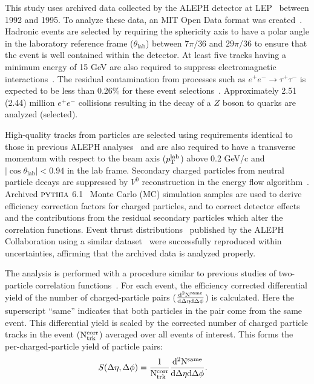 \documentclass[aps,prl,twocolumn,superscriptaddress,groupedaddress]{revtex4}  %
\begin{document}
This study uses archived data collected by the ALEPH detector at LEP~\cite{Decamp:1990jra} between 1992 and 1995. To analyze these data, an MIT Open Data format was created~\cite{Tripathee:2017ybi}. Hadronic events are selected by requiring the sphericity axis to have a polar angle in the laboratory reference frame ($\theta_{\text{lab}}$) between $7\pi/36$ and $29\pi/36$ to ensure that the event is well contained within the detector. At least five tracks having a minimum energy of 15 GeV are also required to suppress electromagnetic interactions~\cite{Barate:1996fi}. The residual contamination from processes such as $e^+e^-\rightarrow\tau^+\tau^-$ is expected to be less than 0.26\% for these event selections~\cite{Barate:1996fi}. Approximately 2.51 (2.44) million $e^+e^-$ collisions resulting in the decay of a $Z$ boson to quarks are analyzed (selected).

  High-quality tracks from particles are selected using requirements identical to those in previous ALEPH analyses~\cite{Barate:1996fi} and are also required to have a transverse momentum with respect to the beam axis ($p_{\rm T}^{\rm lab}$) above 0.2 GeV/c and $|\cos{\theta_{\text{lab}}}|<0.94$ in the lab frame. Secondary charged particles from neutral particle decays are suppressed by $V^0$ reconstruction in the energy flow algorithm~\cite{Barate:1996fi}. Archived $\textsc{pythia}$ 6.1~\cite{Sjostrand:2000wi} Monte Carlo (MC) simulation samples are used to derive efficiency correction factors for charged particles, and to correct detector effects and the contributions from the residual secondary particles which alter the correlation functions.  Event thrust distributions~\cite{Farhi:1977sg} published by the ALEPH Collaboration using a similar dataset~\cite{Heister:2003aj} were successfully reproduced within uncertainties, affirming that the archived data is analyzed properly. %
 
 The analysis is performed with a procedure similar to previous studies of two-particle correlation functions~\cite{CMS:2012qk}. For each event, the efficiency corrected differential yield of the number of charged-particle pairs ($\frac{\rm d^2 N^{\rm same}}{\rm d\Delta\eta \rm d\Delta\phi}$) is calculated.  Here the superscript ``same'' indicates that both particles in the pair come from the same event. This differential yield is scaled by the corrected number of charged particle tracks in the event ($\rm N_{\text{trk}}^{corr}$) averaged over all events of interest.  This forms the per-charged-particle yield of particle pairs:
 \begin{align}
    S(\Delta\eta,\Delta\phi) &= \frac{1}{\rm N_{\rm trk}^{corr}}\frac{\rm d^2 N^{\rm same}}{\rm d\Delta\eta \rm d\Delta\phi}.
\end{align}
\end{document}
